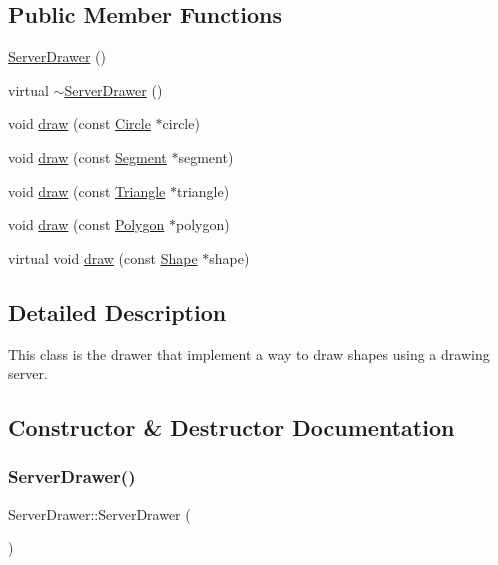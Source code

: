 \subsection*{Public Member Functions}
\begin{DoxyCompactItemize}
\item 
\hyperlink{class_server_drawer_a533e227591169905b2b4eba7c6c3d3bc}{Server\+Drawer} ()
\item 
virtual \hyperlink{class_server_drawer_a40a7d8a070305d246bb12b23af81e72b}{$\sim$\+Server\+Drawer} ()
\item 
void \hyperlink{class_server_drawer_a70bd94ed93c913b53d689fb8fc5dddc9}{draw} (const \hyperlink{class_circle}{Circle} $\ast$circle)
\item 
void \hyperlink{class_server_drawer_a2bec9e70a1111d59b6c2d7de0908d780}{draw} (const \hyperlink{class_segment}{Segment} $\ast$segment)
\item 
void \hyperlink{class_server_drawer_aad913eff7f5c248003ef70ec8c09d2b2}{draw} (const \hyperlink{class_triangle}{Triangle} $\ast$triangle)
\item 
void \hyperlink{class_server_drawer_acd973f89e7618d67fcd8db364df0b6bf}{draw} (const \hyperlink{class_polygon}{Polygon} $\ast$polygon)
\item 
virtual void \hyperlink{class_server_drawer_a071fa49ab9edc71554b32aaaf7422b7f}{draw} (const \hyperlink{class_shape}{Shape} $\ast$shape)
\end{DoxyCompactItemize}


\subsection{Detailed Description}
This class is the drawer that implement a way to draw shapes using a drawing server. 

\subsection{Constructor \& Destructor Documentation}
\hypertarget{class_server_drawer_a533e227591169905b2b4eba7c6c3d3bc}{}\label{class_server_drawer_a533e227591169905b2b4eba7c6c3d3bc} 
\subsubsection{\texorpdfstring{Server\+Drawer()}{ServerDrawer()}}
{\footnotesize\ttfamily Server\+Drawer\+::\+Server\+Drawer (\begin{DoxyParamCaption}{ }\end{DoxyParamCaption})}

